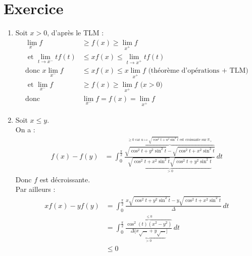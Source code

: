 \documentclass{report}
\begin{document}
\section{Exercice}
\begin{enumerate}
    \item Soit $x > 0$, d'après le TLM : 
    \begin{align*}
        \lim_{x^-} f &\geq f(x) \geq \lim_{x^+} f \\
        \text{ et } \lim_{t\to x^-} tf(t) &\leq xf(x) \leq \lim_{t\to x^+} tf(t) \\
        \text{donc } x \lim_{x^-} f &\leq xf(x) \leq x \lim_{x^+} f \text{ (théorème d'opérations + TLM)} \\
        \text{ et } \lim_{x^-} f &\geq f(x) \geq \lim_{x^+} f \text{ ($x > 0$)} \\
        \text{donc } &\boxed{\lim_{x^-} f = f(x) = \lim_{x^+} f}
    \end{align*}

    \item Soit $x \leq y$. \\
    On a : 
    \begin{align*}
        f(x) - f(y) &= \int_{0}^{\frac{\pi}{2}} \frac{\overbrace{\sqrt{\cos^2 t + y^2 \sin^2 t} - \sqrt{\cos^2 t + x^2 \sin^2 t}}^{\geq 0 \text{ car } u\mapsto \sqrt{\cos^2 t + u^2 \sin^2 t} \text{ est croissante sur } \mathbb{R}_+}}{\underbrace{\sqrt{\cos^2 t + x^2 \sin^2 t} \sqrt{\cos^2 t + y^2 \sin^2 t}}_{> 0}} \,dt
    \end{align*}
    Donc $f$ est décroissante. \\
    Par ailleurs : 
    \begin{align*}
        xf(x) - yf(y) &= \int_{0}^{\frac{\pi}{2}} \frac{x\sqrt{\cos^2 t + y^2 \sin^2 t} - y\sqrt{\cos^2 t + x^2 \sin^2 t}}{\Delta} \,dt \\
        &= \int_{0}^{\frac{\pi}{2}} \frac{\overbrace{\cos^2 (t) (x^2 - y^2)}^{\leq 0}}{\underbrace{\Delta[x\sqrt{\ldots} + y\sqrt{\ldots}}_{> 0}]} \,dt \\
        &\leq 0
    \end{align*}
\end{enumerate}

\setcounter{section}{7}
\end{document}
